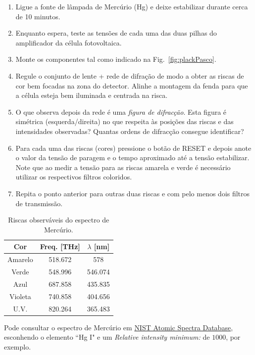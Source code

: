 \documentclass[a4paper,12pt]{article}  %
\begin{document}
\begin{enumerate}
\item Ligue a fonte de lâmpada de Mercúrio (Hg) e deixe estabilizar durante cerca de 10 minutos.
\item Enquanto espera, teste as tensões de cada uma das duas pilhas do amplificador da célula fotovoltaica.
\item Monte os componentes tal como indicado na Fig.~\ref{fig:plackPasco}.
\item Regule o conjunto de lente + rede de difração de modo a obter as riscas de cor bem focadas na zona do detector. Alinhe a montagem da fenda para que a célula esteja bem iluminada e centrada na risca.
\item O que observa depois da rede é uma \emph{figura de difracção}. 
Esta figura é simétrica (esquerda/direita) no que respeita às posições das riscas e das intensidades observadas? Quantas ordens de difracção consegue identificar?
\item Para cada uma das riscas (cores) pressione o botão de RESET e depois anote o valor da tensão de paragem e o tempo aproximado até a tensão estabilizar. Note que ao medir a tensão para as riscas amarela e verde é necessário utilizar os respectivos filtros coloridos.
\item Repita o ponto anterior para outras duas riscas  e com pelo menos dois filtros de transmissão.
\end{enumerate}


\begin{table}[!hbp]
\begin{center}
	\begin{tabular}{|c|c|c|}
	\hline
	Cor  & Freq. [THz] & $\lambda$ [nm]  \\
	\hline
	Amarelo & 518.672 & 578 \\
	Verde & 548.996 & 546.074\\
	Azul & 687.858  & 435.835 \\
	Violeta & 740.858  & 404.656\\
	U.V.    & 820.264  & 365.483 \\
	\hline
 	\end{tabular}
	\caption{Riscas observáveis do espectro de Mercúrio.} 
	\label{tab:Hg}
	\end{center}
\end{table}

Pode consultar o espectro de Mercúrio em  \href{http://physics.nist.gov/asd}{
NIST Atomic Spectra Database}, esconhendo o elemento ``Hg I" e um \emph{Relative intensity minimum:} de $1000$, por exemplo. 	  	
\end{document}
